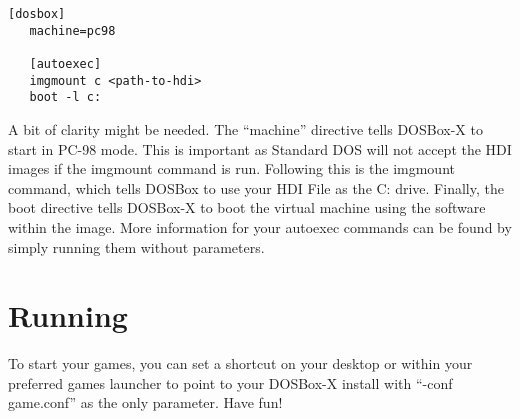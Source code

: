 \documentclass[letterpaper]{article}
\begin{document}
   \begin{lstlisting}[frame=single]
   [dosbox]
   machine=pc98
   
   [autoexec]
   imgmount c <path-to-hdi>
   boot -l c:
   \end{lstlisting} 
   
   A bit of clarity might be needed. The ``machine'' directive tells DOSBox-X to start in PC-98 mode. This is important as Standard DOS will not accept the HDI images if the imgmount command is run. Following this is the imgmount command, which tells DOSBox to use your HDI File as the C: drive. Finally, the boot directive tells DOSBox-X to boot the virtual machine using the software within the image. More information for your autoexec commands can be found by simply running them without parameters.
   
   \section{Running}
   To start your games, you can set a shortcut on your desktop or within your preferred games launcher to point to your DOSBox-X install with ``-conf game.conf'' as the only parameter. Have fun!
\end{document}

